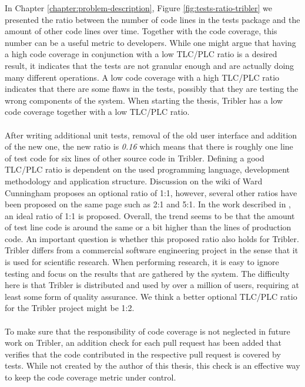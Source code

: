 In Chapter \ref{chapter:problem-description}, Figure \ref{fig:tests-ratio-tribler} we presented the ratio between the number of code lines in the tests package and the amount of other code lines over time. Together with the code coverage, this number can be a useful metric to developers. While one might argue that having a high code coverage in conjunction with a low TLC/PLC ratio is a desired result, it indicates that the tests are not granular enough and are actually doing many different operations. A low code coverage with a high TLC/PLC ratio indicates that there are some flaws in the tests, possibly that they are testing the wrong components of the system. When starting the thesis, Tribler has a low code coverage together with a low TLC/PLC ratio.\\\\
After writing additional unit tests, removal of the old user interface and addition of the new one, the new ratio is \emph{0.16} which means that there is roughly one line of test code for six lines of other source code in Tribler. Defining a good TLC/PLC ratio is dependent on the used programming language, development methodology and application structure. Discussion on the wiki of Ward Cunningham\cite{c2tlcratio} proposes an optional ratio of 1:1, however, several other ratios have been proposed on the same page such as 2:1 and 5:1. In the work described in \cite{van2001refactoring}, an ideal ratio of 1:1 is proposed. Overall, the trend seems to be that the amount of test line code is around the same or a bit higher than the lines of production code. An important question is whether this proposed ratio also holds for Tribler. Tribler differs from a commercial software engineering project in the sense that it is used for scientific research. When performing research, it is easy to ignore testing and focus on the results that are gathered by the system. The difficulty here is that Tribler is distributed and used by over a million of users, requiring at least some form of quality assurance. We think a better optional TLC/PLC ratio for the Tribler project might be 1:2.\\\\
To make sure that the responsibility of code coverage is not neglected in future work on Tribler, an addition check for each pull request has been added that verifies that the code contributed in the respective pull request is covered by tests. While not created by the author of this thesis, this check is an effective way to keep the code coverage metric under control.

